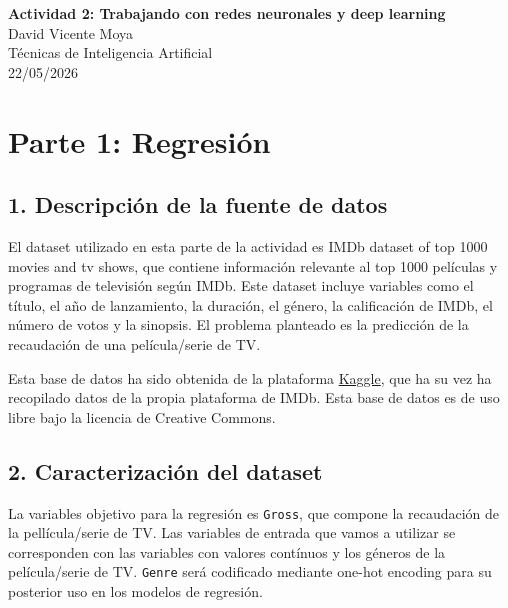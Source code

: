 \documentclass[11pt,a4paper]{article}
\begin{document}

\begin{center}
    {\Large \textbf{Actividad 2: Trabajando con redes neuronales y deep learning}}\\[0.5cm]
    
    David Vicente Moya\\
    Técnicas de Inteligencia Artificial\\
    22/05/2026
\end{center}

\vspace{1cm}


\section*{Parte 1: Regresión}
\subsection*{1. Descripción de la fuente de datos}
El dataset utilizado en esta parte de la actividad es IMDb dataset of top 1000 
movies and tv shows, que contiene información relevante al top 1000 películas y 
programas de televisión según IMDb. Este dataset incluye variables como el título, el 
año de lanzamiento, la duración, el género, la calificación de IMDb, el número de votos 
y la sinopsis. El problema planteado es la predicción de la recaudación de una 
película/serie de TV.

Esta base de datos ha sido obtenida de la plataforma \href{https://www.kaggle.com/datas
ets/harshitshankhdhar/imdb-dataset-of-top-1000-movies-and-tv-shows?resource=download}
{Kaggle}, que ha su vez ha recopilado datos de la propia plataforma de IMDb. Esta base 
de datos es de uso libre bajo la licencia de Creative Commons.

\subsection*{2. Caracterización del dataset}

La variables objetivo para la regresión es \texttt{Gross}, que compone la recaudación
de la pellícula/serie de TV. Las variables de entrada que vamos a utilizar se 
corresponden con las variables con valores contínuos y los géneros de la película/serie 
de TV. \texttt{Genre} será codificado mediante one-hot encoding para su posterior uso
en los modelos de regresión.
\end{document}
